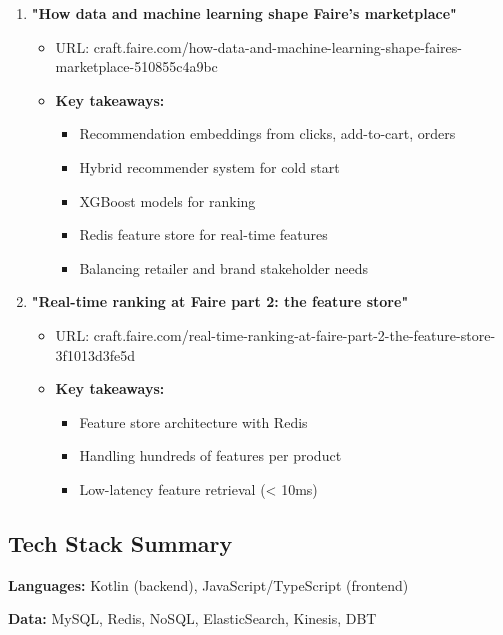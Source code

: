 \documentclass[11pt,letterpaper]{article}
\begin{document}
\begin{enumerate}
    \item \textbf{"How data and machine learning shape Faire's marketplace"}
    \begin{itemize}
        \item URL: craft.faire.com/how-data-and-machine-learning-shape-faires-marketplace-510855c4a9bc
        \item \textbf{Key takeaways:}
        \begin{itemize}
            \item Recommendation embeddings from clicks, add-to-cart, orders
            \item Hybrid recommender system for cold start
            \item XGBoost models for ranking
            \item Redis feature store for real-time features
            \item Balancing retailer and brand stakeholder needs
        \end{itemize}
    \end{itemize}

    \item \textbf{"Real-time ranking at Faire part 2: the feature store"}
    \begin{itemize}
        \item URL: craft.faire.com/real-time-ranking-at-faire-part-2-the-feature-store-3f1013d3fe5d
        \item \textbf{Key takeaways:}
        \begin{itemize}
            \item Feature store architecture with Redis
            \item Handling hundreds of features per product
            \item Low-latency feature retrieval (< 10ms)
        \end{itemize}
    \end{itemize}
\end{enumerate}

\subsection{Tech Stack Summary}

\textbf{Languages:} Kotlin (backend), JavaScript/TypeScript (frontend)

\textbf{Data:} MySQL, Redis, NoSQL, ElasticSearch, Kinesis, DBT
\end{document}
